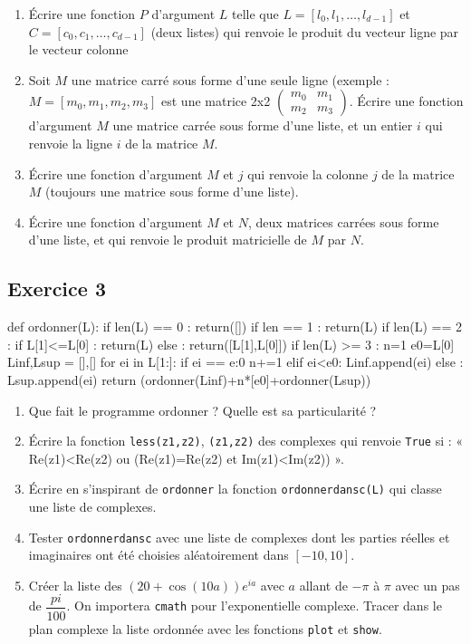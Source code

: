 \documentclass[10pt,fleqn]{article} %
\begin{document}
\begin{multicols}{2}
\begin{enumerate}
\item Écrire une fonction $P$ d'argument $L$ telle que $L = [l_0, l_1,…,l_{d-1}]$ et $C = [c_0,c_1,…,c_{d-1}]$ (deux listes) qui renvoie le produit du vecteur ligne par le vecteur colonne
\item Soit $M$ une matrice carré sous forme d'une seule ligne (exemple : $M = [m_0,m_1,m_2,m_3]$ est une matrice 2x2 $\begin{pmatrix} m_0 & m_1 \\m_2 & m_3 \end{pmatrix}$. Écrire une fonction d'argument $M$ une matrice carrée sous forme d'une liste, et un entier $i$ qui renvoie la ligne $i$ de la matrice $M$.
\item Écrire une fonction d’argument $M$ et $j$ qui renvoie la colonne $j$ de la matrice $M$ (toujours une matrice sous forme d'une liste).
\item Écrire une fonction d'argument $M$ et $N$, deux matrices carrées sous forme d'une liste, et qui renvoie le produit matricielle de $M$ par $N$. 
\end{enumerate}


\subsection*{Exercice 3}
\begin{py}
\begin{python}
def ordonner(L):
    if len(L) == 0 :
        return([])
    if len == 1 :
        return(L)
    if len(L) == 2 :
        if L[1]<=L[0] :
            return(L)
        else :
            return([L[1],L[0]])
    if len(L) >= 3 :
        n=1
        e0=L[0]
        Linf,Lsup = [],[]
        for ei in L[1:]:
            if ei == e:0
                n+=1
            elif ei<e0:
                Linf.append(ei)
            else :
                Lsup.append(ei)
    return (ordonner(Linf)+n*[e0]+ordonner(Lsup))
\end{python}
\end{py}


\begin{enumerate}
\item Que fait le programme ordonner ? Quelle est sa particularité ? 
\item Écrire la fonction \texttt{less(z1,z2)}, \texttt{(z1,z2)} des complexes qui renvoie \texttt{True} si : 
« Re(z1)<Re(z2) ou (Re(z1)=Re(z2) et Im(z1)<Im(z2)) ».
\item Écrire en s’inspirant de \texttt{ordonner} la fonction \texttt{ordonnerdansc(L)} qui classe une liste de complexes.
\item Tester \texttt{ordonnerdansc} avec une liste de complexes dont les parties réelles et imaginaires ont été choisies aléatoirement dans $[-10,10]$.
\item Créer la liste des $(20+\cos(10a))e^{ia}$ avec $a$ allant de $-\pi$ à $\pi$ avec un pas de $\dfrac{pi}{100}$. On importera \texttt{cmath} pour l’exponentielle complexe. Tracer dans le plan complexe la liste ordonnée avec les fonctions \texttt{plot} et \texttt{show}.
\end{enumerate}


\end{multicols}
\end{document}
